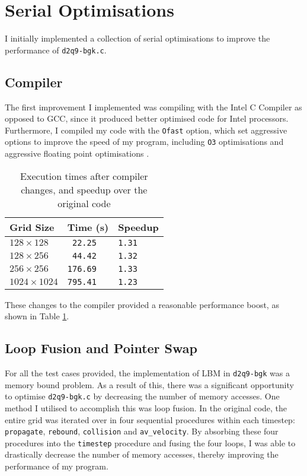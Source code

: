 \documentclass[11pt, twocolumn, a4paper]{article}
\begin{document}
\section{Serial Optimisations}

I initially implemented a collection of serial optimisations to improve the performance of \texttt{d2q9-bgk.c}.

\subsection{Compiler}

The first improvement I implemented was compiling with the Intel C Compiler as opposed to GCC, since it produced better optimised code for Intel processors.
Furthermore, I compiled my code with the \texttt{Ofast} option, which set aggressive options to improve the speed of my program, including \texttt{O3} optimisations and aggressive floating point optimisations \cite{icc}.

\begin{table}[htbp]
  \begin{center}
  \caption{Execution times after compiler changes, and speedup over the original code}\label{tab:compiler_changes}
  \begin{tabular}{l | l l} 
      \hline\hline
      Grid Size&Time (s)&Speedup\\
      \hline
      $128 \times 128$&\texttt{ 22.25}&\texttt{1.31}\\
      $128 \times 256$&\texttt{ 44.42}&\texttt{1.32}\\
      $256 \times 256$&\texttt{176.69}&\texttt{1.33}\\
      $1024 \times 1024$&\texttt{795.41}&\texttt{1.23}\\
      \hline
    \end{tabular}
  \end{center}
\end{table}

These changes to the compiler provided a reasonable performance boost, as shown in Table \ref{tab:compiler_changes}.

\subsection{Loop Fusion and Pointer Swap}

For all the test cases provided, the implementation of LBM in \texttt{d2q9-bgk} was a memory bound problem.
As a result of this, there was a significant opportunity to optimise \texttt{d2q9-bgk.c} by decreasing the number of memory accesses.
One method I utilised to accomplish this was loop fusion.
In the original code, the entire grid was iterated over in four sequential procedures within each timestep: \texttt{propagate}, \texttt{rebound}, \texttt{collision} and \texttt{av\_velocity}.
By absorbing these four procedures into the \texttt{timestep} procedure and fusing the four loops, I was able to drastically decrease the number of memory accesses, thereby improving the performance of my program.
\end{document}
